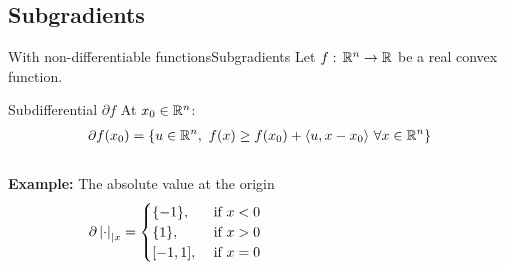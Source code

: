 \documentclass[10pt,aspectratio=43]{beamer}
\begin{document}


\subsection{Subgradients}
\begin{frame}{With non-differentiable functions}{Subgradients}
Let $f:\,\mathbb{R}^n\rightarrow \mathbb{R}$ be a real convex function.
\begin{block}{Subdifferential $\partial f$}
    At $x_0\in\mathbb{R}^n$:
    \begin{align*}
        \partial f(x_0) = \left\{ u \in \mathbb{R}^n,\ f(x) \geq f(x_0) +
        \langle u, x-x_0\rangle\ \forall x\in \mathbb{R}^n\right\}
    \end{align*}
\end{block}
\begin{columns}
\begin{column}{.4\textwidth}
\textbf{Example: } The absolute value at the origin
\[\partial \left \vert \cdot \right \vert_{|x} =
\begin{cases}
    \{-1\}, & \text{ if } x <0\\
    \{1\}, & \text{ if }x>0 \\
    [-1, 1],& \text{ if } x=0 \end{cases}
\]
\end{column}
\begin{column}{.6\textwidth}
\begin{figure}[h]
    \centering
{}
\end{figure}
\end{column}
\end{columns}
\end{frame}
\end{document}
